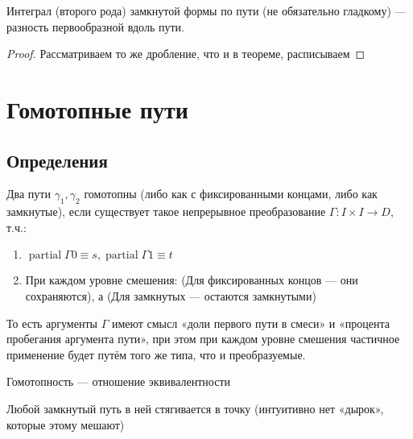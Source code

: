 \documentclass[12pt, a4paper, oneside]{memoir}
\begin{document}
\begin{corollary}

    Интеграл (второго рода) замкнутой формы по пути (не обязательно гладкому) 
    — разность первообразной вдоль пути.

    \begin{proof}
        Рассматриваем то же дробление, что и в теореме, расписываем
    \end{proof}
\end{corollary}


\section{Гомотопные пути}


\subsection{Определения}

\begin{definition}
    Два пути $\gamma_1, \gamma_2$ гомотопны (либо как с фиксированными концами, либо как замкнутые), 
    если существует такое непрерывное преобразование $\Gamma: I × I → D$, т.ч.:

    \begin{enumerate}
        \item $\operatorname{partial} \Gamma 0 \equiv s, \operatorname{partial} \Gamma 1 \equiv t$
        \item При каждом уровне смешения: (Для фиксированных концов — они сохраняются), 
        а (Для замкнутых — остаются замкнутыми)
    \end{enumerate}
\end{definition}

\begin{remark}
    То есть аргументы $\Gamma$ имеют смысл «доли первого пути в смеси» и «процента пробегания аргумента пути»,
    при этом при каждом уровне смешения частичное применение будет путём того же типа, что и преобразуемые.
\end{remark}

\begin{remark}
    Гомотопность — отношение эквивалентности
\end{remark}

\begin{definition}

    Любой замкнутый путь в ней стягивается в точку (интуитивно нет «дырок», которые этому мешают)
\end{definition}
\end{document}
